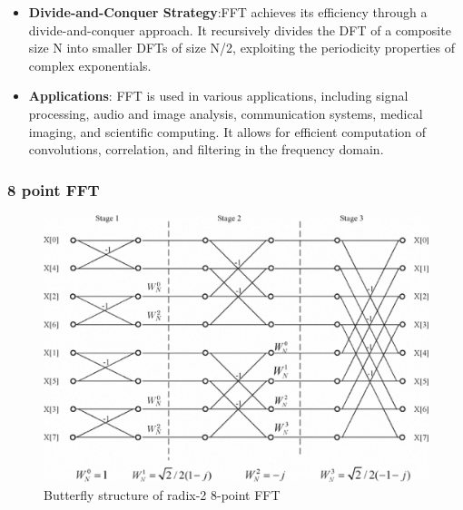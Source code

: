 \documentclass{beamer}
\begin{document}
\begin{frame}
	\begin{itemize}
		\item \textbf{Divide-and-Conquer Strategy}:FFT achieves its efficiency through a divide-and-conquer approach. It recursively divides the DFT of a composite size N into smaller DFTs of size N/2, exploiting the periodicity properties of complex exponentials.
		\item \textbf{Applications}: FFT is used in various applications, including signal processing, audio and image analysis, communication systems, medical imaging, and scientific computing. It allows for efficient computation of convolutions, correlation, and filtering in the frequency domain.
	\end{itemize}
\end{frame}

\begin{frame}
	\frametitle{8 point FFT}

		\begin{figure}[h!]
  		\centering
    			\includegraphics[width=0.7\linewidth]{./figs/fft.png}
		\caption{Butterfly structure of radix-2 8-point FFT}
		\label{fig:fig2}
		\end{figure}	
\end{frame}
\end{document}
